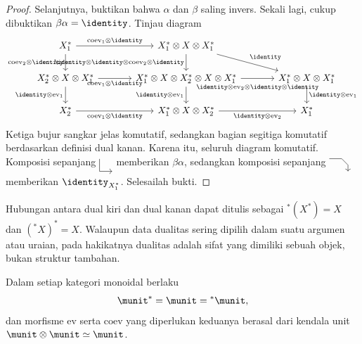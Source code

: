 \begin{proof}
	Selanjutnya, buktikan bahwa $\alpha$ dan $\beta$ saling invers. Sekali lagi,
	cukup dibuktikan $\beta\alpha=\identity$. Tinjau diagram
	\[\begin{tikzcd}[column sep=large]
		X_1^* \arrow[d, "{\mathrm{coev}_2 \otimes \identity}"'] \arrow[r, "{\mathrm{coev}_1 \otimes \identity}"] & X_1^* \otimes X \otimes X_1^* \arrow[d, "{\identity \otimes \identity \otimes \mathrm{coev}_2 \otimes \identity}"'] \arrow[rd, "\identity"] & \\
		X_2^* \otimes X \otimes X_1^* \arrow[r, "{\mathrm{coev}_1 \otimes \identity}"'] \arrow[d, "{\identity \otimes \mathrm{ev}_1}"'] & X_1^* \otimes X \otimes X_2^* \otimes X \otimes X_1^* \arrow[d, "{\identity \otimes \mathrm{ev}_1}"'] \arrow[r, "{\identity \otimes \mathrm{ev}_2 \otimes \identity \otimes \identity}"' inner sep=0.6em] &  X_1^* \otimes X \otimes X_1^* \arrow[d, "{\identity \otimes \mathrm{ev}_1}"] \\
		X_2^* \arrow[r, "{\mathrm{coev}_1 \otimes \identity}"'] & X_1^* \otimes X \otimes X_2^* \arrow[r, "{\identity \otimes \mathrm{ev}_2}"'] & X_1^*
	\end{tikzcd}\]
	Ketiga bujur sangkar jelas komutatif, sedangkan bagian segitiga komutatif
	berdasarkan definisi dual kanan. Karena itu, seluruh diagram komutatif.
	Komposisi sepanjang
	$\begin{tikzpicture}[baseline=(O), scale=0.45]
		\coordinate (O) at (0, 0.5);
		\draw[->] (0, 1) -- (0, 0) -- (1, 0);
	\end{tikzpicture}$
	memberikan $\beta\alpha$, sedangkan komposisi sepanjang
	$\begin{tikzpicture}[baseline=(O), scale=0.45]
		\coordinate (O) at (0, 0.5);
		\draw[->] (0, 1) -- (1, 1) -- (1.5, 0.5) -- (1.5, 0);
	\end{tikzpicture}$
	memberikan $\identity_{X_1^*}$. Selesailah bukti.
\end{proof}

Hubungan antara dual kiri dan dual kanan dapat ditulis sebagai
${}^*(X^*)=X$ dan $({}^*X)^*=X$. Walaupun data dualitas sering dipilih dalam
suatu argumen atau uraian, pada hakikatnya dualitas adalah sifat yang dimiliki
sebuah objek, bukan struktur tambahan.

\begin{example}
	Dalam setiap kategori monoidal berlaku
	\[ \munit^* = \munit = {}^* \munit, \]
	dan morfisme $\mathrm{ev}$ serta $\mathrm{coev}$ yang diperlukan keduanya
	berasal dari kendala unit $\munit\otimes\munit\simeq\munit$.
\end{example}

